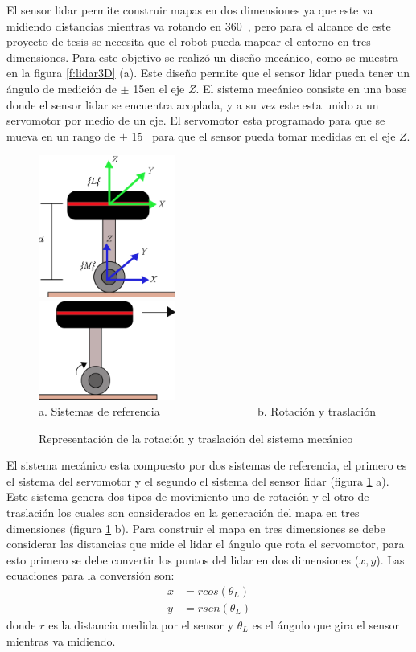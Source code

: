 El sensor lidar permite construir mapas en dos dimensiones ya que este va midiendo 
distancias mientras va rotando en 360\grad ~, pero para el alcance de este proyecto de 
tesis se necesita que el robot pueda mapear el entorno en tres dimensiones. Para este
objetivo se realizó un diseño mecánico, como se muestra en la figura \ref{f:lidar3D} (a). Este
diseño permite que el sensor lidar pueda tener un ángulo de medición de $\pm$ 15\grad en el 
eje $Z$. El sistema mecánico consiste en una base donde el sensor lidar se encuentra acoplada, 
y a su vez este esta unido a un servomotor por medio de un eje. El servomotor esta programado para 
que se mueva en un rango de $\pm$ 15\grad~ para que el sensor pueda tomar medidas 
en el eje $Z$. 

\begin{figure}%
	\centering \footnotesize
	\includegraphics[width=0.40\textwidth]{images/lidar_ref.png}~~~~~~~~~~~~
	\includegraphics[width=0.40\textwidth]{images/lidar_giro.png}
	\\ a. Sistemas de referencia ~~$\qquad\qquad\qquad$~~ b. Rotación y traslación 
	\captionsetup{font=footnotesize}
  	\caption{Representación de la rotación y traslación del sistema mecánico}
  	\label{f:Rot3D}
\end{figure}

El sistema mecánico esta compuesto por dos sistemas de referencia, el primero es el sistema 
del servomotor y el segundo el sistema del sensor lidar (figura \ref{f:Rot3D} a). Este sistema
genera dos tipos de movimiento uno de rotación y el otro de traslación los cuales son considerados
en la generación del mapa en tres dimensiones (figura \ref{f:Rot3D} b). Para construir el mapa en 
tres dimensiones se debe considerar las distancias que mide el lidar el ángulo que rota el 
servomotor, para esto primero se debe convertir los puntos del lidar en dos dimensiones 
($x,y$). Las ecuaciones para la conversión son:
\begin{align*}
	x &= rcos(\theta_{L}) \\
	y &= rsen(\theta_{L})
\end{align*}
donde $r$ es la distancia medida por el sensor y $\theta_{L}$ es el ángulo que gira el sensor 
mientras va midiendo.

